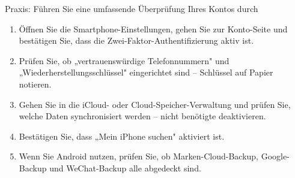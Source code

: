\begin{tcbpractice}{Praxis: Führen Sie eine umfassende Überprüfung Ihres Kontos durch}
\begin{enumerate}
  \item Öffnen Sie die Smartphone-Einstellungen, gehen Sie zur Konto-Seite und bestätigen Sie, dass die Zwei-Faktor-Authentifizierung aktiv ist.
  \item Prüfen Sie, ob „vertrauenswürdige Telefonnummern" und „Wiederherstellungsschlüssel" eingerichtet sind – Schlüssel auf Papier notieren.
  \item Gehen Sie in die iCloud- oder Cloud-Speicher-Verwaltung und prüfen Sie, welche Daten synchronisiert werden – nicht benötigte deaktivieren.
  \item Bestätigen Sie, dass „Mein iPhone suchen" aktiviert ist.
  \item Wenn Sie Android nutzen, prüfen Sie, ob Marken-Cloud-Backup, Google-Backup und WeChat-Backup alle abgedeckt sind.
\end{enumerate}

\end{tcbpractice}
